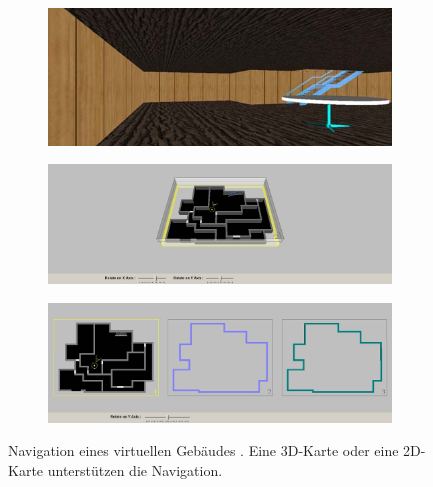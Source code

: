 \begin{figure}[ptb]
	\centering
	\begin{subfigure}{0.6\textwidth}
		\includegraphics[width=\textwidth]{figures/chittaro2006_ve.png}
		\caption{}
		\label{sfig:chittaro2006_ve}
	\end{subfigure}

	\begin{subfigure}{0.6\textwidth}
		\includegraphics[width=\textwidth]{figures/chittaro2006_3dm.png}
		\caption{}
		\label{sfig:chittaro2006_3dm}
	\end{subfigure}

	\begin{subfigure}{0.6\textwidth}
		\includegraphics[width=\textwidth]{figures/chittaro2006_2dm.png}
		\caption{}
		\label{sfig:chittaro2006_2dm}
	\end{subfigure}
	\caption{Navigation eines virtuellen Gebäudes . Eine 3D-Karte  oder eine 2D-Karte  unterstützen die Navigation.}
	\label{fig:chittaro2006_maps}
\end{figure}

